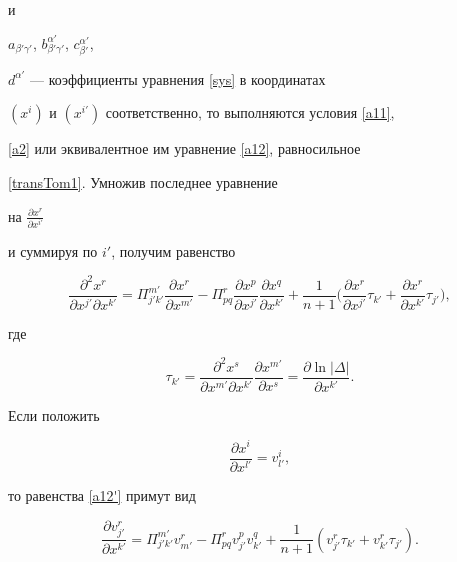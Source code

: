 и


$a_{\beta'\gamma'}$, $b^{\alpha'}_{\beta'\gamma'}$, $c^{\alpha'}_{\beta'}$,


$d^{\alpha'}$ --- коэффициенты уравнения \eqref{sys} в координатах


$(x^i)$ и $(x^{i'})$ соответственно, то выполняются условия \eqref{a11},


\eqref{a2} или эквивалентное им уравнение \eqref{a12}, равносильное


\eqref{transTom1}. Умножив последнее уравнение


на $\frac{\partial x^r}{\partial x^{i'}}$


и суммируя по $i'$, получим равенство


\begin{equation}\label{a12'}


\frac{\partial^2 x^r}{\partial x^{j'}\partial x^{k'}}=


\Pi^{m'}_{j'k'}\frac{\partial x^r}{\partial x^{m'}}


-\Pi^{r}_{pq}\frac{\partial x^p}{\partial x^{j'}}


\frac{\partial x^q}{\partial x^{k'}}+\frac{1}{n+1}


\bigg(\frac{\partial x^r}{\partial x^{j'}}\tau_{k'}+


\frac{\partial x^r}{\partial x^{k'}}\tau_{j'}\bigg),


\end{equation}


где


$$


\tau_{k'}=\frac{\partial^2 x^s}


{\partial x^{m'}\partial x^{k'}}


\frac{\partial x^{m'}}{\partial x^s}


=\frac{\partial \ln |\Delta|}


{\partial x^{k'}}.


$$


Если положить


\begin{equation}\label{a17}


\frac{\partial x^{i}}{\partial x^{l'}}=v^i_{l'},


\end{equation}


то равенства \eqref{a12'} примут вид


\begin{equation}\label{a18}


\frac{\partial v^r_{j'}}{\partial x^{k'}}=\Pi^{m'}_{j'k'}{v^r_{m'}}


-\Pi^{r}_{pq}{v^p_{j'}} {v^q_{k'}}+\frac{1}{n+1}


(v^r_{j'}\tau_{k'}+v^r_{k'}\tau_{j'}).


\end{equation}


